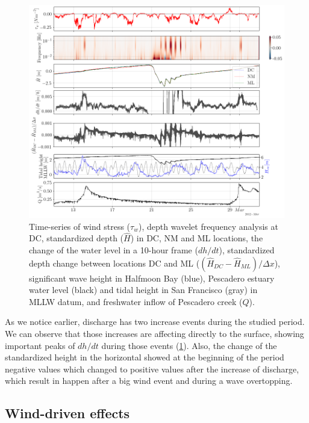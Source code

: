 \documentclass[11pt,letterpaper]{article}
\begin{document}
\begin{figure}[h!]
    \centering
    \includegraphics[width=\textwidth]{Imagenes/surf.png}
    \caption{Time-series of wind stress ($\tau_w$), depth wavelet frequency analysis at DC, standardized depth ($\hat{H}$) in DC, NM and ML locations, the change of the water level in a 10-hour frame ($dh/dt$), standardized depth change between locations DC and ML ($(\hat{H}_{DC}-\hat{H}_{ML})/\Delta x$), significant wave height in Halfmoon Bay (blue), Pescadero estuary water level (black) and tidal height in San Francisco (gray) in MLLW datum, and freshwater inflow of Pescadero creek ($Q$).}
    \label{fig:surf}
\end{figure}

As we notice earlier, discharge has two increase events during the studied period. We can observe that those increases are affecting directly to the surface, showing important peaks of $dh/dt$ during those events (\ref{fig:surf}). Also, the change of the standardized height in the horizontal showed at the beginning of the period negative values which changed to positive values after the increase of discharge, which result in happen after a big wind event and during a wave overtopping.\\

\subsection{Wind-driven effects}
\end{document}
